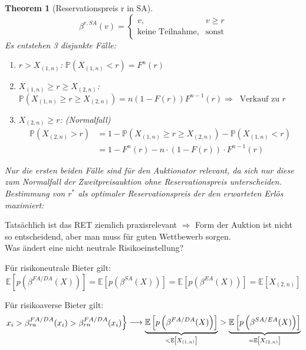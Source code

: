 \documentclass[12pt]{extreport} %
\theoremstyle{named}
\newtheorem{unnamedtheorem}{Theorem} \counterwithin{unnamedtheorem}{chapter}
\theoremstyle{itshape}
\theoremstyle{normal}
\begin{document}
\begin{unnamedtheorem}[Reservationspreis r in SA]
	$$ \beta^{r, SA}(v) = \begin{cases} v, & v \geq r \\ \text{keine Teilnahme}, & \text{sonst} \end{cases} $$
	Es entstehen 3 disjunkte Fälle:
	\begin{enumerate}
		\item $r > X_{(1, n)}$: $\mathbb{P}\left( X_{(1,n)} < r \right) = F^{n}(r)$
		\item $X_{(1,n)} \geq r \geq X_{(2,n)}$: $\mathbb{P}\left( X_{(1,n)} \geq r \geq X_{(2, n)} \right) = n\left(1-F(r) \right) F^{n-1}(r) \Rightarrow ~ \text{ Verkauf zu } r$
		\item $X_{(2,n)} \geq r$: (Normalfall)
			\begin{align*}
				\mathbb{P}\left( X_{(2,n)} > r \right) & = 1 - \mathbb{P}\left( X_{(1,n)} \geq r \geq X_{(2,n)} \right) - \mathbb{P} \left( X_{(1,n)} < r \right) \\
				& = 1 - F^{n}(r) - n \cdot \left( 1 - F(r) \right) \cdot F^{n-1}(r)
			\end{align*}
	\end{enumerate}
	Nur die ersten beiden Fälle sind für den Auktionator relevant, da sich nur diese zum Normalfall der Zweitpreisauktion ohne Reservationspreis unterscheiden. ~\\
	
	Bestimmung von $r^{*}$ als optimaler Reservationspreis der den erwarteten Erlös maximiert:
\end{unnamedtheorem}

Tatsächlich ist das RET ziemlich praxisrelevant $\Rightarrow$ Form der Auktion ist nicht so entscheidend, aber man muss für guten Wettbewerb sorgen. \\ 

Was ändert eine nicht neutrale Risikoeinstellung? ~\\

\begin{description}
	\item Für risikoneutrale Bieter gilt:
		$$ \mathbb{E} \left[ p\left( \beta^{FA/DA}(X) \right) \right] = \mathbb{E} \left[ p\left( \beta^{SA}(X) \right) \right] = \mathbb{E} \left[ p\left( \beta^{EA}(X) \right) \right] = \mathbb{E} \left[ X_{(2,n)} \right]  $$
	\item Für risikoaverse Bieter gilt:
		$$ \begin{rcases} x_{i} > \beta_{ra}^{FA/DA}(x_{i}) > \beta_{rn}^{FA/DA}(x_{i}) \end{rcases} \longrightarrow \underbrace{\mathbb{E}\left[ p \left( \beta^{FA/DA}(X) \right) \right]}_{< \mathbb{E}\left[ X_{(1,n)} \right]} > \underbrace{\mathbb{E}\left[ p \left( \beta^{SA/EA}(X) \right) \right]}_{= \mathbb{E}\left[ X_{(2,n)} \right]} $$
\end{description} 
\end{document}
